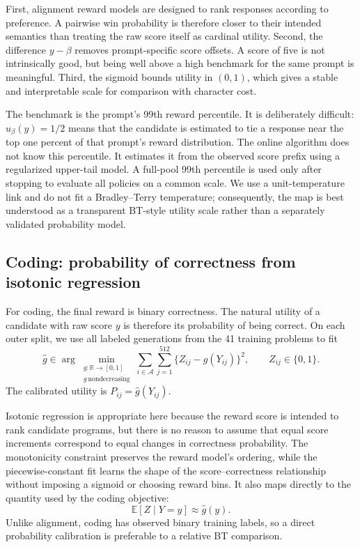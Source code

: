First, alignment reward models are designed to rank responses according to
preference.  A pairwise win probability is therefore closer to their intended
semantics than treating the raw score itself as cardinal utility.  Second,
the difference $y-\beta$ removes prompt-specific score offsets.  A score of
five is not intrinsically good, but being well above a high benchmark for the
same prompt is meaningful.  Third, the sigmoid bounds utility in $(0,1)$,
which gives a stable and interpretable scale for comparison with character
cost.

The benchmark is the prompt's 99th reward percentile.  It is deliberately
difficult: $u_\beta(y)=1/2$ means that the candidate is estimated to tie a
response near the top one percent of that prompt's reward distribution.  The
online algorithm does not know this percentile.  It estimates it from the
observed score prefix using a regularized upper-tail model.  A full-pool 99th
percentile is used only after stopping to evaluate all policies on a common
scale.  We use a unit-temperature link and do not fit a Bradley--Terry
temperature; consequently, the map is best understood as a transparent
BT-style utility scale rather than a separately validated probability model.

\subsection{Coding: probability of correctness from isotonic regression}
\label{sec:isotonic-calibration}

For coding, the final reward is binary correctness.  The natural utility of a
candidate with raw score $y$ is therefore its probability of being correct.
On each outer split, we use all labeled generations from the 41 training
problems to fit
\begin{equation}
 \widehat g\in
 \arg\min_{\substack{g:\mathbb R\to[0,1]\\g\ \mathrm{nondecreasing}}}
 \sum_{i\in\mathcal A}\sum_{j=1}^{512}
 \{Z_{ij}-g(Y_{ij})\}^2,
 \qquad Z_{ij}\in\{0,1\}.
 \label{eq:isotonic-map}
\end{equation}
The calibrated utility is $P_{ij}=\widehat g(Y_{ij})$.

Isotonic regression is appropriate here because the reward score is intended
to rank candidate programs, but there is no reason to assume that equal score
increments correspond to equal changes in correctness probability.  The
monotonicity constraint preserves the reward model's ordering, while the
piecewise-constant fit learns the shape of the score--correctness relationship
without imposing a sigmoid or choosing reward bins.  It also maps directly to
the quantity used by the coding objective:
\begin{equation}
  \mathbb E[Z\mid Y=y]\approx\widehat g(y).
\end{equation}
Unlike alignment, coding has observed binary training labels, so a direct
probability calibration is preferable to a relative BT comparison.

